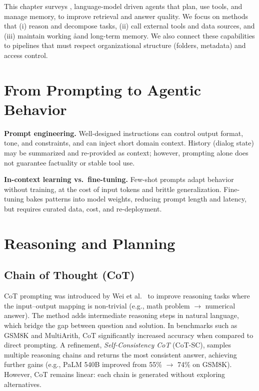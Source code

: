 \label{chap:sota-agentic-ai}
\cleardoublepage

This chapter surveys , language-model driven agents that plan, use tools, and manage memory, to improve retrieval and answer quality. We focus on methods that (i) reason and decompose tasks, (ii) call external tools and data sources, and (iii) maintain working åand long-term memory. We also connect these capabilities to  pipelines that must respect organizational structure (folders, metadata) and access control.

\section{From Prompting to Agentic Behavior}
\textbf{Prompt engineering.} Well-designed instructions can control output format, tone, and constraints, and can inject short domain context. History (dialog state) may be summarized and re-provided as context; however, prompting alone does not guarantee factuality or stable tool use.

\textbf{In-context learning vs.\ fine-tuning.} Few-shot prompts adapt behavior without training, at the cost of input tokens and brittle generalization. Fine-tuning bakes patterns into model weights, reducing prompt length and latency, but requires curated data, cost, and re-deployment.

\section{Reasoning and Planning}
\subsection{Chain of Thought (CoT)}
CoT prompting was introduced by Wei et al.~\cite{chainofthought} to improve reasoning tasks where the input–output mapping is non-trivial (e.g., math problem $\to$ numerical answer). The method adds intermediate reasoning steps in natural language, which bridge the gap between question and solution.
In benchmarks such as GSM8K and MultiArith, CoT significantly increased accuracy when compared to direct prompting. A refinement, \emph{Self-Consistency CoT} (CoT-SC), samples multiple reasoning chains and returns the most consistent answer, achieving further gains (e.g., PaLM 540B improved from 55\% $\to$ 74\% on GSM8K). However, CoT remains linear: each chain is generated without exploring alternatives.

